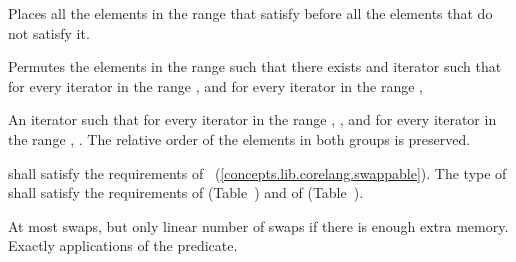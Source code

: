 \begin{itemdescr}
\pnum
\begin{removedblock}
\effects
Places all the elements in the range
that satisfy  before all the
elements that do not satisfy it.
\end{removedblock}

\begin{addedblock}
\effects Permutes the elements in the range  such that there exists and iterator 
such that for every iterator  in the range 
, and for every iterator  in the
range , 
\end{addedblock}

\pnum
\returns
An iterator
such that for every iterator
in the range
,
,
and for every iterator
in the range
,
.
The relative order of the elements in both groups is preserved.

\begin{removedblock}
\pnum
\requires
{} shall satisfy the requirements of
~(\ref{concepts.lib.corelang.swappable}). The type
of  shall satisfy the requirements of
 (Table~) and of
 (Table~).
\end{removedblock}

\pnum
\complexity
At most
swaps, but only linear number of swaps if there is enough extra memory.
Exactly
applications of the predicate.
\end{itemdescr}

